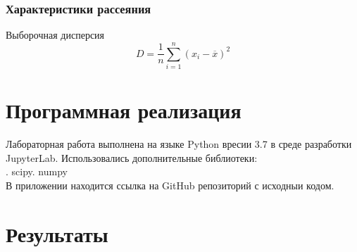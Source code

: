 \documentclass{article}
\begin{document}
	\subsubsection{Характеристики рассеяния}
	Выборочная дисперсия
	\begin{equation}
		D = \frac{1}{n}\sum_{i=1}^{n}{(x_i-\overline{x})^2}
	\end{equation}
	
\section {Программная реализация}
\noindent Лабораторная работа выполнена на языке Python вресии 3.7 в среде разработки JupyterLab. Использовались дополнительные библиотеки:\\ . scipy. numpy\newline
\\
В приложении находится ссылка на GitHub репозиторий с исходныи кодом.

\section {Результаты} 
\end{document}
